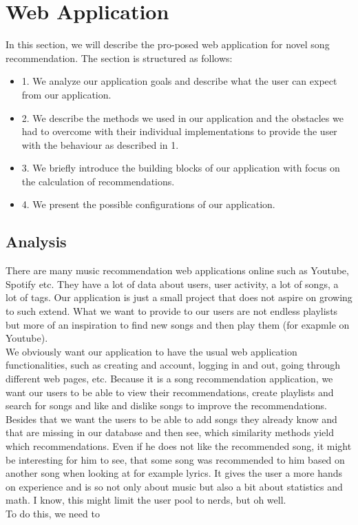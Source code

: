 \chapter{Web Application}

In this section, we will describe the pro-posed web application for novel song recommendation.  The section is structured as follows: 
\begin{itemize}
    \item 1. We analyze our application goals and describe what the user can expect from our application.
    \item 2. We describe the methods we used in our application and the obstacles we had to overcome with their individual implementations to provide the user with the behaviour as described in 1.
    \item 3. We briefly introduce the building blocks of our application with focus on the calculation of recommendations.
    \item 4. We present the possible configurations of our application.
\end{itemize}

\section{Analysis}

There are many music recommendation web applications online such as Youtube, Spotify etc. They have a lot of data about users, user activity, a lot of songs, a lot of tags. Our application is just a small project that does not aspire on growing to such extend. What we want to provide to our users are not endless playlists but more of an inspiration to find new songs and then play them (for exapmle on Youtube). \\
We obviously want our application to have the usual web application functionalities, such as creating and account, logging in and out, going through different web pages, etc. Because it is a song recommendation application, we want our users to be able to view their recommendations, create playlists and search for songs and like and dislike songs to improve the recommendations. Besides that we want the users to be able to add songs they already know and that are missing in our database and then see, which similarity methods yield which recommendations. Even if he does not like the recommended song, it might be interesting for him to see, that some song was recommended to him based on another song when looking at for example lyrics. It gives the user a more hands on experience and is so not only about music but also a bit about statistics and math. I know, this might limit the user pool to nerds, but oh well.\\
To do this, we need to 